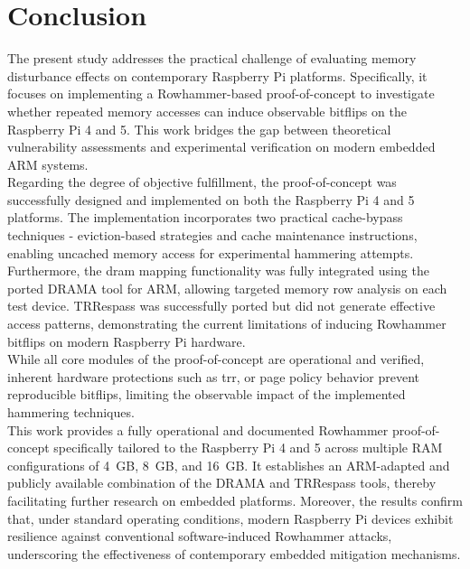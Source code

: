 \clearpage
\section{Conclusion} \label{sec:conclusion}
  The present study addresses the practical challenge of evaluating memory 
  disturbance effects on contemporary Raspberry Pi platforms. Specifically, 
  it focuses on implementing a Rowhammer-based proof-of-concept to investigate 
  whether repeated memory accesses can induce observable bitflips on the 
  Raspberry Pi 4 and 5. This work bridges the gap between theoretical 
  vulnerability assessments and experimental verification on modern embedded 
  ARM systems.
  \\
  Regarding the degree of objective fulfillment, the proof-of-concept was successfully 
  designed and implemented on both the Raspberry Pi 4 and 5 platforms. The implementation 
  incorporates two practical cache-bypass techniques - eviction-based strategies and cache 
  maintenance instructions, enabling uncached memory access for experimental hammering attempts.
  Furthermore, the \gls{dram} mapping functionality was fully integrated using the ported DRAMA 
  tool for ARM, allowing targeted memory row analysis on each test device. TRRespass 
  was successfully ported but did not generate effective access patterns, demonstrating 
  the current limitations of inducing Rowhammer bitflips on modern Raspberry Pi hardware.
  \\
  While all core modules of the proof-of-concept are operational and verified, inherent 
  hardware protections such as \gls{trr}, or page policy 
  behavior prevent reproducible bitflips, limiting the observable impact 
  of the implemented hammering techniques.
  \\
  This work provides a fully operational and documented Rowhammer proof-of-concept 
  specifically tailored to the Raspberry Pi 4 and 5 across multiple RAM configurations of 
  4~GB, 8~GB, and 16~GB. It establishes an ARM-adapted and publicly available combination 
  of the DRAMA and TRRespass tools, thereby facilitating further research on embedded 
  platforms. Moreover, the results confirm that, under standard operating conditions, 
  modern Raspberry Pi devices exhibit resilience against conventional software-induced 
  Rowhammer attacks, underscoring the effectiveness of contemporary embedded mitigation 
  mechanisms.
